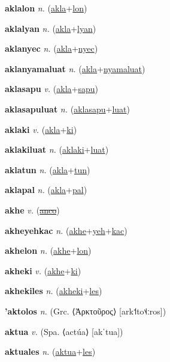\textbf{\hypertarget{aklalon}{aklalon}} \textit{n.} (\hyperlink{akla}{akla}+\allowbreak \hyperlink{lon}{lon})


\textbf{\hypertarget{aklalyan}{aklalyan}} \textit{n.} (\hyperlink{akla}{akla}+\allowbreak \hyperlink{lyan}{lyan})


\textbf{\hypertarget{aklanyec}{aklanyec}} \textit{n.} (\hyperlink{akla}{akla}+\allowbreak \hyperlink{nyec}{nyec})


\textbf{\hypertarget{aklanyamaluat}{aklanyamaluat}} \textit{n.} (\hyperlink{akla}{akla}+\allowbreak \hyperlink{nyamaluat}{nyamaluat})


\textbf{\hypertarget{aklasapu}{aklasapu}} \textit{v.} (\hyperlink{akla}{akla}+\allowbreak \hyperlink{sapu}{sapu})


\textbf{\hypertarget{aklasapuluat}{aklasapuluat}} \textit{n.} (\hyperlink{aklasapu}{aklasapu}+\allowbreak \hyperlink{luat}{luat})


\textbf{\hypertarget{aklaki}{aklaki}} \textit{v.} (\hyperlink{akla}{akla}+\allowbreak \hyperlink{ki}{ki})


\textbf{\hypertarget{aklakiluat}{aklakiluat}} \textit{n.} (\hyperlink{aklaki}{aklaki}+\allowbreak \hyperlink{luat}{luat})


\textbf{\hypertarget{aklatun}{aklatun}} \textit{n.} (\hyperlink{akla}{akla}+\allowbreak \hyperlink{tun}{tun})


\textbf{\hypertarget{aklapal}{aklapal}} \textit{n.} (\hyperlink{akla}{akla}+\allowbreak \hyperlink{pal}{pal})


\textbf{\hypertarget{akhe}{akhe}} \textit{v.} (\hyperlink{anco}{\sout{anco}})


\textbf{\hypertarget{akheyehkac}{akheyehkac}} \textit{n.} (\hyperlink{akhe}{akhe}+\allowbreak \hyperlink{yeh}{yeh}+\allowbreak \hyperlink{kac}{kac})


\textbf{\hypertarget{akhelon}{akhelon}} \textit{n.} (\hyperlink{akhe}{akhe}+\allowbreak \hyperlink{lon}{lon})


\textbf{\hypertarget{akheki}{akheki}} \textit{v.} (\hyperlink{akhe}{akhe}+\allowbreak \hyperlink{ki}{ki})


\textbf{\hypertarget{akhekiles}{akhekiles}} \textit{n.} (\hyperlink{akheki}{akheki}+\allowbreak \hyperlink{les}{les})


\textbf{\hypertarget{'aktolos}{'aktolos}} \textit{n.} (Grc. ⟨Ἀρκτοῦρος⟩ [ark˦to˦˨ːros])


\textbf{\hypertarget{aktua}{aktua}} \textit{v.} (Spa. ⟨actúa⟩ [akˈtua])


\textbf{\hypertarget{aktuales}{aktuales}} \textit{n.} (\hyperlink{aktua}{aktua}+\allowbreak \hyperlink{les}{les})


